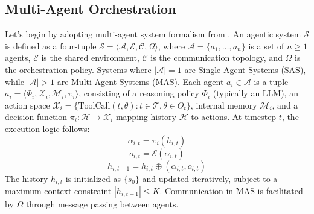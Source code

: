 \subsection{Multi-Agent Orchestration}
Let's begin by adopting multi-agent system formalism  from \citet{guo2024largelanguagemodelbased,zhu2025agentic}.
An agentic system $\mathcal{S}$ is defined as a four-tuple $\mathcal{S} = \langle \mathcal{A}, \mathcal{E}, \mathcal{C}, \Omega \rangle$, where $\mathcal{A} = \{a_1, \dots, a_n\}$ is a set of $n \ge 1$ agents, $\mathcal{E}$ is the shared environment, $\mathcal{C}$ is the communication topology, and $\Omega$ is the orchestration policy. Systems where $|\mathcal{A}|=1$ are Single-Agent Systems (SAS), while $|\mathcal{A}|>1$ are Multi-Agent Systems (MAS).
Each agent $a_i \in \mathcal{A}$ is a tuple $a_i = \langle \Phi_i, \mathcal{X}_i, \mathcal{M}_i, \pi_i \rangle$, consisting of a reasoning policy $\Phi_i$ (typically an LLM), an action space $\mathcal{X}_i = \{ \text{ToolCall}(t, \theta) : t \in \mathcal{T}, \theta \in \Theta_t \}$, internal memory $\mathcal{M}_i$, and a decision function $\pi_i : \mathcal{H} \to \mathcal{X}_i$ mapping history $\mathcal{H}$ to actions.
At timestep $t$, the execution logic follows:
$$\alpha_{i,t} = \pi_i(h_{i,t})$$
$$o_{i,t} = \mathcal{E}(\alpha_{i,t})$$
$$h_{i,t+1} = h_{i,t} \oplus (\alpha_{i,t}, o_{i,t})$$
The history $h_{i,t}$ is initialized as $\{s_0\}$ and updated iteratively, subject to a maximum context constraint $|h_{i,t+1}| \le K$. Communication in MAS is facilitated by $\Omega$ through message passing between agents.

